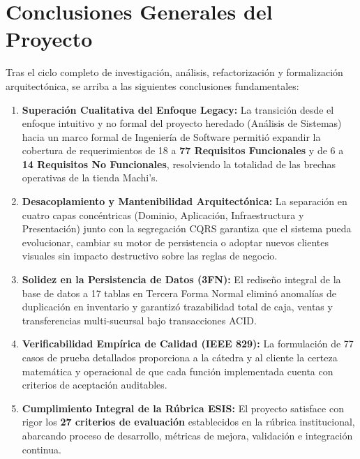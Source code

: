 \section{Conclusiones Generales del Proyecto}
Tras el ciclo completo de investigación, análisis, refactorización y formalización arquitectónica, se arriba a las siguientes conclusiones fundamentales:
\begin{enumerate}
    \item \textbf{Superación Cualitativa del Enfoque Legacy:} La transición desde el enfoque intuitivo y no formal del proyecto heredado (Análisis de Sistemas) hacia un marco formal de Ingeniería de Software permitió expandir la cobertura de requerimientos de 18 a \textbf{77 Requisitos Funcionales} y de 6 a \textbf{14 Requisitos No Funcionales}, resolviendo la totalidad de las brechas operativas de la tienda Machi's.
    \item \textbf{Desacoplamiento y Mantenibilidad Arquitectónica:} La separación en cuatro capas concéntricas (Dominio, Aplicación, Infraestructura y Presentación) junto con la segregación CQRS garantiza que el sistema pueda evolucionar, cambiar su motor de persistencia o adoptar nuevos clientes visuales sin impacto destructivo sobre las reglas de negocio.
    \item \textbf{Solidez en la Persistencia de Datos (3FN):} El rediseño integral de la base de datos a 17 tablas en Tercera Forma Normal eliminó anomalías de duplicación en inventario y garantizó trazabilidad total de caja, ventas y transferencias multi-sucursal bajo transacciones ACID.
    \item \textbf{Verificabilidad Empírica de Calidad (IEEE 829):} La formulación de 77 casos de prueba detallados proporciona a la cátedra y al cliente la certeza matemática y operacional de que cada función implementada cuenta con criterios de aceptación auditables.
    \item \textbf{Cumplimiento Integral de la Rúbrica ESIS:} El proyecto satisface con rigor los \textbf{27 criterios de evaluación} establecidos en la rúbrica institucional, abarcando proceso de desarrollo, métricas de mejora, validación e integración continua.
\end{enumerate}

